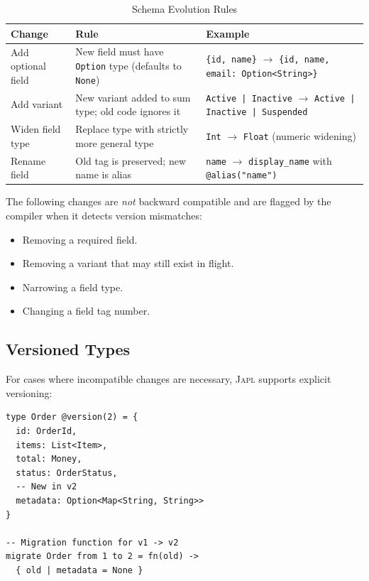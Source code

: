 \documentclass[11pt,a4paper]{article}
\newcommand{\japl}{\textsc{Japl}}
\begin{document}
\begin{table}[H]
\centering
\caption{Schema Evolution Rules}
\label{tab:evolution}
\begin{tabularx}{\textwidth}{lXX}
\toprule
\textbf{Change} & \textbf{Rule} & \textbf{Example} \\
\midrule
Add optional field & New field must have \texttt{Option} type
  (defaults to \texttt{None}) &
  \texttt{\{id, name\}} $\to$ \texttt{\{id, name, email: Option<String>\}} \\
\addlinespace
Add variant & New variant added to sum type; old code ignores it &
  \texttt{Active | Inactive} $\to$ \texttt{Active | Inactive | Suspended} \\
\addlinespace
Widen field type & Replace type with strictly more general type &
  \texttt{Int} $\to$ \texttt{Float} (numeric widening) \\
\addlinespace
Rename field & Old tag is preserved; new name is alias &
  \texttt{name} $\to$ \texttt{display\_name} with
  \texttt{@alias("name")} \\
\bottomrule
\end{tabularx}
\end{table}

The following changes are \emph{not} backward compatible and are flagged
by the compiler when it detects version mismatches:

\begin{itemize}[nosep]
  \item Removing a required field.
  \item Removing a variant that may still exist in flight.
  \item Narrowing a field type.
  \item Changing a field tag number.
\end{itemize}

\subsection{Versioned Types}

For cases where incompatible changes are necessary, \japl{} supports
explicit versioning:

\begin{lstlisting}
type Order @version(2) = {
  id: OrderId,
  items: List<Item>,
  total: Money,
  status: OrderStatus,
  -- New in v2
  metadata: Option<Map<String, String>>
}

-- Migration function for v1 -> v2
migrate Order from 1 to 2 = fn(old) ->
  { old | metadata = None }
\end{lstlisting}
\end{document}
